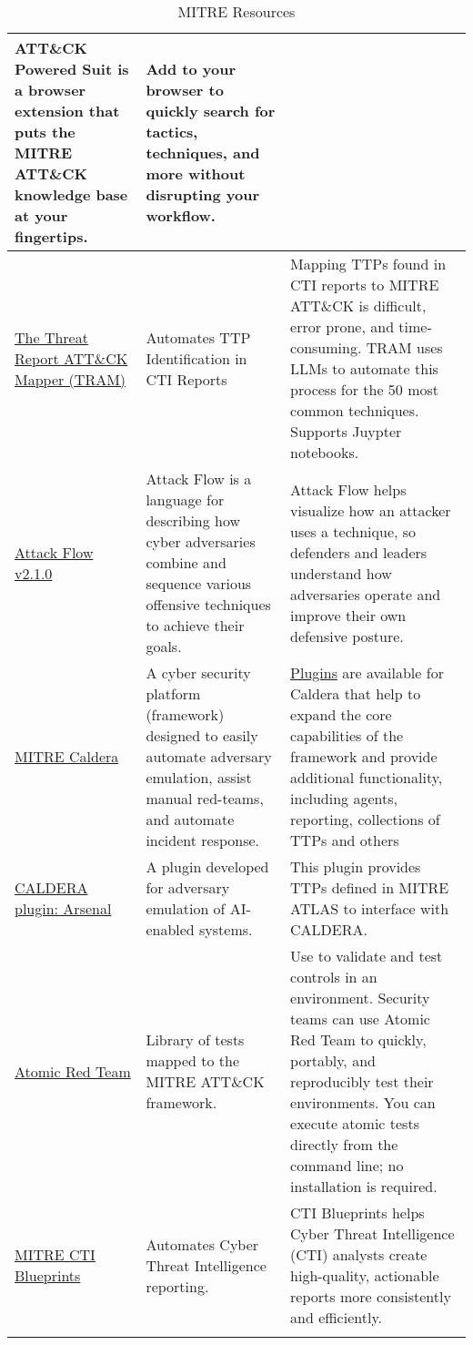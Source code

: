 \begin{longtable}[c]{|p{}|p{}|p{}|}
  ATT\&CK Powered Suit is a browser extension that puts the MITRE ATT\&CK
  knowledge base at your fingertips. &
  Add to your browser to quickly search for tactics, techniques, and more
  without disrupting your workflow. \\
  \hline
  \href{https://mitre-engenuity.org/cybersecurity/center-for-threat-informed-defense/our-work/threat-report-attck-mapper-tram/}{The Threat Report ATT\&CK Mapper (TRAM)} &
  Automates TTP Identification in CTI Reports &
  Mapping TTPs found in CTI reports to MITRE ATT\&CK is difficult, error prone,
  and time-consuming. TRAM uses LLMs to automate this process for the 50 most
  common techniques. Supports Juypter notebooks. \\
  \hline
  \href{https://center-for-threat-informed-defense.github.io/attack-flow/}{Attack Flow v2.1.0} &
  Attack Flow is a language for describing how cyber adversaries combine and
  sequence various offensive techniques to achieve their goals.  &
  Attack Flow helps visualize how an attacker uses a technique, so defenders
  and leaders understand how adversaries operate and improve their own
  defensive posture. \\
  \hline
  \href{https://caldera.mitre.org/}{MITRE Caldera} &
  A cyber security platform (framework) designed to easily automate adversary
  emulation, assist manual red-teams, and automate incident response. &
  \href{https://caldera.readthedocs.io/en/latest/Plugin-library.html}{Plugins} are available for Caldera that help to expand the core capabilities
  of the framework and provide additional functionality, including agents,
  reporting, collections of TTPs and others
 \\
  \hline
  \href{https://github.com/mitre-atlas/arsenal}{CALDERA plugin: Arsenal} &
  A plugin developed for adversary emulation of AI-enabled systems.  &
  This plugin provides TTPs defined in MITRE ATLAS to interface with CALDERA. \\
  \hline
  \href{https://github.com/redcanaryco/atomic-red-team}{Atomic Red Team} &
  Library of tests mapped to the MITRE ATT\&CK framework. &
  Use to validate and test controls in an environment. Security teams can use
  Atomic Red Team to quickly, portably, and reproducibly test their environments.
  You can execute atomic tests directly from the command line; no installation
  is required.
 \\
  \hline
  \href{https://mitre-engenuity.org/cybersecurity/center-for-threat-informed-defense/our-work/cti-blueprints/}{MITRE CTI Blueprints} &
  Automates Cyber Threat Intelligence reporting. &
  CTI Blueprints helps Cyber Threat Intelligence (CTI) analysts create
  high-quality, actionable reports more consistently and efficiently.
 \\
  \hline
  \caption{MITRE Resources}
  \label{tab:mitre-resources}
\end{longtable}